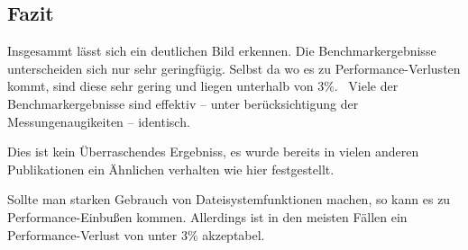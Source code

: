 \subsection{Fazit}

Insgesammt lässt sich ein deutlichen Bild erkennen. Die Benchmarkergebnisse unterscheiden sich nur sehr geringfügig. Selbst da wo es zu Performance-Verlusten kommt, sind diese sehr gering und liegen unterhalb von $3\%$. \
Viele der Benchmarkergebnisse sind effektiv – unter berücksichtigung der Messungenaugikeiten – identisch.

Dies ist kein Überraschendes Ergebniss, es wurde bereits in vielen anderen Publikationen ein Ähnlichen verhalten wie hier festgestellt.  

Sollte man starken Gebrauch von Dateisystemfunktionen machen, so kann es zu Performance-Einbußen kommen. Allerdings ist in den meisten Fällen ein Performance-Verlust von unter $3\%$ akzeptabel. 